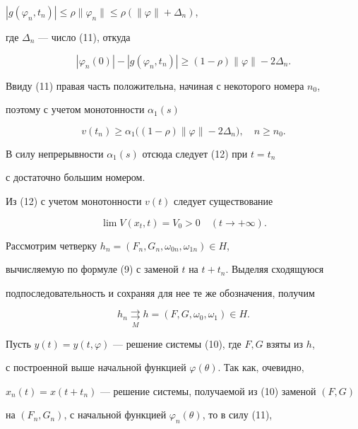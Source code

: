\begin{pf}
$|g(\varphi_n,t_n)|\leqslant\rho\|\varphi_n\|


\leqslant\rho(\|\varphi\|+\Delta_n)$,


где $\Delta_n$ --- число (11), откуда


$$


|\varphi_n(0)|-|g(\varphi_n,t_n)|\geqslant(1-\rho)\|\varphi\|-2\Delta_n.


$$


Ввиду (11) правая часть положительна, начиная с некоторого номера $n_0$,


поэтому с учетом монотонности $\alpha_1(s)$


$$


v(t_n)\geqslant\alpha_1\big((1-\rho)\|\varphi\|-2\Delta_n\big),


\quad n\geqslant n_0.


$$


В силу непрерывности $\alpha_1(s)$ отсюда следует (12) при $t=t_n$


с достаточно большим номером. 





Из (12) с учетом монотонности $v(t)$ следует существование


\begin{equation}


\lim V(x_t,t)=V_0>0\quad(t\to+\infty).


\end{equation}


Рассмотрим четверку $h_n=(F_n,G_n,\omega_{0n},\omega_{1n})\in H$,


вычисляемую по формуле (9) с заменой $t$ на $t+t_n$. Выделяя сходящуюся


подпоследовательность и сохраняя для нее те же обозначения, получим


\begin{equation}


h_n\underset{M}{\rightrightarrows}{}


h=(F,G,\omega_0,\omega_1)\in H.


\end{equation}


Пусть $y(t)=y(t,\varphi)$ --- решение системы (10), где $F,G$ взяты из $h$,


с построенной выше начальной функцией $\varphi(\theta)$. Так как, очевидно,


$x_n(t)=x(t+t_n)$ --- решение системы, получаемой из (10) заменой $(F,G)$


на $(F_n,G_n)$, с начальной функцией $\varphi_n(\theta)$, то в силу (11),



\end{pf}
